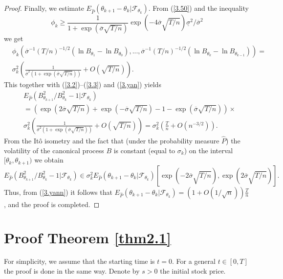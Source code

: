 \documentclass{amsart}
\numberwithin{equation}{section}
\begin{document}
\begin{proof}
Finally, we estimate $E_{\hat P}(\theta_{k+1}-\theta_{k}|\mathcal F_{\theta_k})$.
From (\ref{3.50}) and the inequality
\[\phi_k\geq \frac{1}{1+\exp(\overline{\sigma}\sqrt{T/n})}\exp\left(-4\overline{\sigma}\sqrt{T/n}\right)\underline{\sigma}^2/\overline{\sigma}^2\] we get
\begin{eqnarray*}
&\phi_{k}\left(\overline{\sigma}^{-1}(T/n)^{-1/2}(\ln B_{\theta_1}- \ln B_{\theta_0}),..., \overline{\sigma}^{-1}(T/n)^{-1/2}(\ln B_{\theta_{k}}-\ln B_{\theta_{k-1}})
\right)=\\
&\sigma^2_k\left(\frac{1}{\overline\sigma^2(1+\exp(\overline\sigma\sqrt{T/n}))}+O(\sqrt{T/n})\right).
\end{eqnarray*}
This together with (\ref{3.2})--(\ref{3.3}) and (\ref{3.yan}) yields
\begin{eqnarray}\label{3.yann}
& E_{\hat P}\left( B^2_{\theta_{k+1}}/B^2_{\theta_k}-1|\mathcal F_{\theta_k}\right)\\
&=\left(\exp(2\overline{\sigma}\sqrt{T/n})+\exp(-\overline{\sigma}\sqrt{T/n})-1-\exp(\overline{\sigma}\sqrt{T/n})\right)\times\nonumber\\
&\sigma^2_k\left(\frac{1}{\overline\sigma^2(1+\exp(\overline\sigma\sqrt{T/n}))}+O(\sqrt{T/n})\right)=\sigma^2_k\left(\frac{T}{n}+O(n^{-3/2})\right).\nonumber
\end{eqnarray}
From the
It\^{o} isometry and the fact that (under the probability measure $\hat P$)
the volatility of the canonical process $B$ is constant (equal to $\sigma_k$) on the interval
$[\theta_k,\theta_{k+1})$ we obtain
$$E_{\hat P}\left( B^2_{\theta_{k+1}}/B^2_{\theta_k}-1|\mathcal F_{\theta_k}\right)\in
\sigma^2_k
E_{\hat P}(\theta_{k+1}-\theta_{k}|\mathcal F_{\theta_k})[\exp(-2\overline\sigma\sqrt{T/n}),\exp(2\overline\sigma\sqrt{T/n})].$$
Thus, from (\ref{3.yann}) it follows that $E_{\hat P}(\theta_{k+1}-\theta_{k}|\mathcal F_{\theta_k})=(1+O(1/\sqrt n))\frac{T}{n}$,
and the proof is completed.
\end{proof}


\section{Proof Theorem \ref{thm2.1}}\label{sec:4}\setcounter{equation}{0}
For simplicity, we assume that the starting time is $t=0$. For a general $t\in [0,T]$ the proof is done in the same way.
Denote by $s>0$ the initial stock price.
\end{document}
